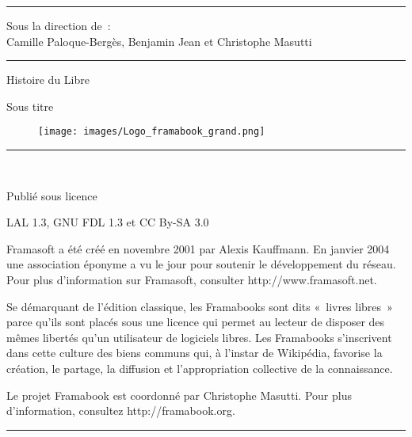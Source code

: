 \documentclass{FramateX}
\begin{document}
            
\begin{titlepage}
\noindent\rule{\linewidth}{1pt}
\begin{center}{Sous la direction de~: \\ Camille Paloque-Bergès, Benjamin Jean et Christophe Masutti}\end{center}
\noindent\rule{\linewidth}{1pt}
\begin{center}\Huge{Histoire du Libre}\end{center}
\begin{center}\LARGE{Sous titre}\end{center}
\begin{center}

\begin{figure}[!ht]
\begin{center}  \texttt{[image: images/Logo\_framabook\_grand.png]}  \end{center}
\end{figure}

\end{center}
\begin{center}
\noindent\rule{\linewidth/2}{1pt} \\
\end{center}
\begin{center}Publié sous licence\end{center}
\begin{center}LAL 1.3, GNU FDL 1.3 et CC By-SA 3.0\end{center}
\newpage 
\begin{flushleft}Framasoft a été créé en novembre 2001 par Alexis Kauffmann. En janvier 2004 une association éponyme a vu le jour pour soutenir le développement du réseau. Pour plus d'information sur Framasoft, consulter http://www.framasoft.net.\end{flushleft}
\begin{flushleft}Se démarquant de l'édition classique, les Framabooks sont dits «~livres libres~» parce qu'ils sont placés sous une licence qui permet au lecteur de disposer des mêmes libertés qu'un utilisateur de logiciels libres. Les Framabooks s'inscrivent dans cette culture des biens communs qui, à l'instar de Wikipédia, favorise la création, le partage, la diffusion et l'appropriation collective de la connaissance.\end{flushleft}
\begin{flushleft}Le projet Framabook est coordonné par Christophe Masutti. Pour plus d'information, consultez http://framabook.org.\end{flushleft}
\begin{center}\rule{100mm}{1pt}\end{center}\bigskip{}


\end{titlepage}
\end{document}
